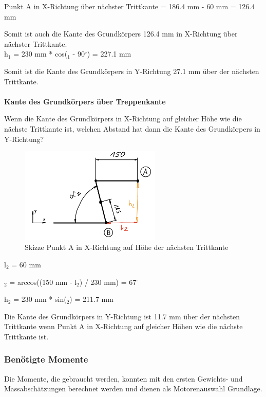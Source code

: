 Punkt A in X-Richtung über nächster Trittkante = 186.4 mm - 60 mm = 126.4 mm

Somit ist auch die Kante des Grundkörpers 126.4 mm in X-Richtung über nächster Trittkante.\\

h$_{1}$ = 230 mm * cos(\alpha$_{1}$ - 90$^\circ$) = 227.1 mm

Somit ist die Kante des Grundkörpers in Y-Richtung 27.1 mm über der nächsten Trittkante.\\
\\

\textbf{Kante des Grundkörpers über Treppenkante}

Wenn die Kante des Grundkörpers in X-Richtung auf gleicher Höhe wie die nächste Trittkante ist, welchen Abstand hat dann die Kante des Grundkörpers in Y-Richtung?\\

\begin{figure}[H]
  \includegraphics[width=0.6\textwidth]{img/Treppensteigen/Analyse 2.png}
  \centering
  \caption{Skizze Punkt A in X-Richtung auf Höhe der nächsten Trittkante}
\end{figure}

l$_{2}$ = 60 mm

\alpha$_{2}$ = arccos((150 mm - l$_{2}$) / 230 mm) = 67$^\circ$

h$_{2}$ = 230 mm * sin(\alpha$_{2}$)  = 211.7 mm

Die Kante des Grundkörpers in Y-Richtung ist 11.7 mm über der nächsten Trittkante wenn Punkt A in X-Richtung auf gleicher Höhen wie die nächste Trittkante ist.\\


\subsubsection{Benötigte Momente}

Die Momente, die gebraucht werden, konnten mit den ersten Gewichts- und Massabschätzungen berechnet werden und dienen als Motorenauswahl Grundlage.

